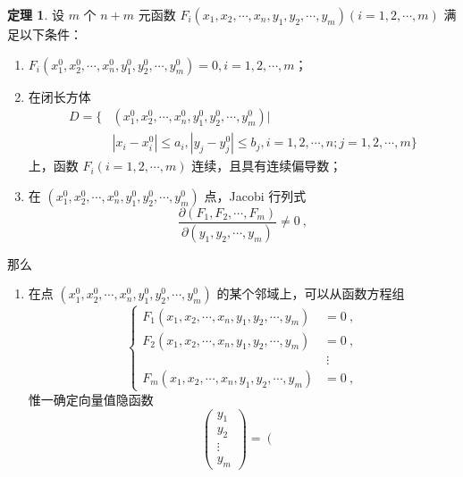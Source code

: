 \documentclass[zihao=-4,linespread=1.8,UTF8,nothm]{aytony_base}
\theoremstyle{definition}
\newtheorem{theorem}{\indent\heiti\textbf{定理}}[subsection]
\begin{document}
\begin{theorem}
    设 $m$ 个 $n + m$ 元函数 $F_i(x_1, x_2, \cdots, x_n, y_1, y_2, \cdots, y_m)(i = 1, 2, \cdots, m)$ 满足以下条件：

    \begin{enumerate}[nosep]
        \item $F_i(x_1^0, x_2^0, \cdots, x_n^0, y^0_1, y^0_2, \cdots, y^0_{m}) = 0, i = 1, 2, \cdots, m$；
        \item 在闭长方体 $$
                  \begin{aligned}
                      D = \{ & (x^0_1, x^0_2, \cdots, x^0_{n}, y^0_1, y^0_2, \cdots, y^0_{m}) | \\&|x_i - x^0_i| \leqslant a_i, |y_j - y^0_j| \leqslant b_j,i = 1, 2, \cdots, n; j = 1, 2, \cdots, m\}
                  \end{aligned}              $$ 上，函数 $F_i(i = 1, 2, \cdots, m)$ 连续，且具有连续偏导数；
        \item 在 $(x^0_1, x^0_2, \cdots, x^0_{n}, y^0_1, y^0_2, \cdots, y^0_{m})$ 点，Jacobi 行列式 $$
                  \dfrac{\partial({F}_1, {F}_2, \cdots, {F}_{m})}{\partial ({y}_1, {y}_2, \cdots, {y}_{m})} \neq 0\ ,
              $$
    \end{enumerate}
    那么
    \begin{enumerate}[nosep]
        \item 在点 $(x^0_1, x^0_2, \cdots, x^0_{n}, y^0_1, y^0_2, \cdots, y^0_{m})$ 的某个邻域上，可以从函数方程组 $$
                  \left\{
                  \begin{aligned}
                      F_1(x_1, x_2, \cdots, x_n, y_1, y_2, \cdots, y_m) & = 0\ ,   \\F_2(x_1, x_2, \cdots, x_n, y_1, y_2, \cdots, y_m) &= 0\ ,\\
                                                                        & \ \vdots \\
                      F_m(x_1, x_2, \cdots, x_n, y_1, y_2, \cdots, y_m) & = 0\ ,
                  \end{aligned}
                  \right.
              $$ 惟一确定向量值隐函数 $$
                  \left(
                  \begin{matrix}
                          y_1 \\y_2\\\vdots\\y_m
                      \end{matrix}
                  \right) = \left(
                  \begin{matrix}

\end{matrix}$$
\end{enumerate}
\end{theorem}
\end{document}
